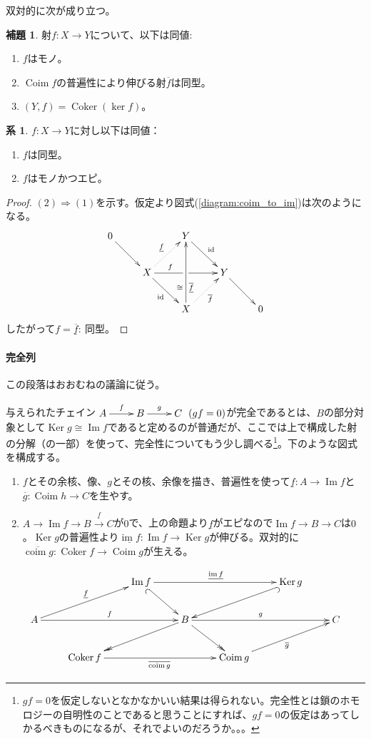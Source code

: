 \documentclass[a4paper,11pt]{jsarticle}
\theoremstyle{definition}
\newtheorem{cor}[thm]{系}
\newtheorem{lem}[thm]{補題}
\DeclareMathOperator{\id}{\mathrm{id}}
\DeclareMathOperator{\Ima}{\mathrm{Im}}
\DeclareMathOperator{\im}{\mathrm{im}}
\DeclareMathOperator{\Coker}{\mathrm{Coker}}
\DeclareMathOperator{\Coim}{\mathrm{Coim}}
\DeclareMathOperator{\coim}{\mathrm{coim}}
\DeclareMathOperator{\Ker}{\mathrm{Ker}}
\renewcommand{\ker}{\mathop{\mathrm{ker}}}
\newcommand{\ou}[1]{\overline{\underline{#1}}}
\begin{document}
双対的に次が成り立つ。
\begin{lem}\label{lem:chalacterizationOfEpi}
  射$f\colon X\to Y$について、以下は同値:
  \begin{enumerate}[label=(\arabic*)]
    \item $f$はモノ。
    \item $\Coim f$の普遍性により伸びる射$\overline f$は同型。
    \item $(Y,f)=\Coker(\ker f)$。
  \end{enumerate}
\end{lem}

\begin{cor}
$f\colon X\to Y$に対し以下は同値：
\begin{enumerate}[label=(\arabic*)]
  \item $f$は同型。
  \item $f$はモノかつエピ。
\end{enumerate}
\end{cor}
\begin{proof}
  $(2)\Rightarrow(1)$を示す。仮定より図式(\ref{diagram:coim_to_im})は次のようになる。
  \[
    \xymatrix{
      0 \ar[rd] & & Y \ar[rd]^{\id} & & \\
      & X \ar[rd]_{\id} \ar[rr]^(.3){f}|\hole \ar@{.>}[ru]^{\underline{f}} & & Y \ar[rd] & \\
      & & X \ar@{.>}[ru]_{\overline{f}} \ar[uu]_(.3){\ou{f}}^(.3){\cong}& & 0
    }
  \]したがって$f=\ou{f}:\ $同型。
\end{proof}

\paragraph{完全列}
この段落はおおむね\cite{kashiwara2005categories}の議論に従う。

与えられたチェイン$\xymatrix{A\ar[r]^f&B\ar[r]^g&C}\ (gf=0)$が完全であるとは、$B$の部分対象として$\Ker g\cong \Ima f$であると定めるのが普通だが、ここでは上で構成した射の分解（の一部）を使って、完全性についてもう少し調べる\footnote{$gf=0$を仮定しないとなかなかいい結果は得られない。完全性とは鎖のホモロジーの自明性のことであると思うことにすれば、$gf=0$の仮定はあってしかるべきものになるが、それでよいのだろうか。。。}。下のような図式を構成する。

\begin{enumerate}[label=\underline{\textsf{Step. \arabic*}}]
  \item $f$とその余核、像、$g$とその核、余像を描き、普遍性を使って$\underline{f}\colon A\to \Ima f$と$\overline{g}\colon \Coim h\to C$を生やす。
  \item $A\to \Ima f\to B\stackrel{\underline{f}}{\to} C$が$0$で、上の命題より$\underline f$がエピなので$\Ima f\to B\to C$は$0$。$\Ker g$の普遍性より$\underline{\im f}\colon\Ima f\to \Ker g$が伸びる。双対的に$\overline{\coim g}\colon\Coker f\to \Coim g$が生える。
\end{enumerate}
\[
\xymatrix{
&&\Ima f\ar@{_(->}[rd]\ar[rrr]^{\underline{\im f}}&&&\Ker g\ar@{^(->}[lld]&\\
A\ar[rrr]^{f}\ar[urr]^{\underline{f}}&&&B\ar[rrr]^{g}\ar@{->>}[lld]\ar@{->>}[rd]&&&C\\
&\Coker f\ar[rrr]_{\overline{\coim g}}&&&\Coim g\ar[urr]_{\overline{g}}&&
}
\]
\end{document}
